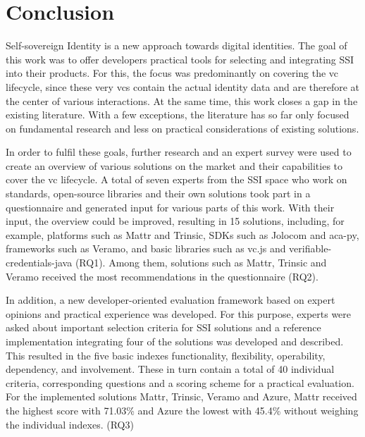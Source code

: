 \chapter{Conclusion}


Self-sovereign Identity is a new approach towards digital identities. The goal of this work was to offer developers practical tools for selecting and integrating \ac{SSI} into their products. For this, the focus was predominantly on covering the \ac{vc} lifecycle, since these very \acp{vc} contain the actual identity data and are therefore at the center of various interactions. At the same time, this work closes a gap in the existing literature. With a few exceptions, the literature has so far only focused on fundamental research and less on practical considerations of existing solutions.

In order to fulfil these goals, further research and an expert survey were used to create an overview of various solutions on the market and their capabilities to cover the \ac{vc} lifecycle. A total of seven experts from the \ac{SSI} space who work on standards, open-source libraries and their own solutions took part in a questionnaire and generated input for various parts of this work. With their input, the overview could be improved, resulting in 15 solutions, including, for example, platforms such as Mattr and Trinsic, SDKs such as Jolocom and aca-py, frameworks such as Veramo, and basic libraries such as vc.js and verifiable-credentials-java (RQ1). Among them, solutions such as Mattr, Trinsic and Veramo received the most recommendations in the questionnaire (RQ2).

In addition, a new developer-oriented evaluation framework based on expert opinions and practical experience was developed. For this purpose, experts were asked about important selection criteria for \ac{SSI} solutions and a reference implementation integrating four of the solutions was developed and described. This resulted in the five basic indexes functionality, flexibility, operability, dependency, and involvement. These in turn contain a total of 40 individual criteria, corresponding questions and a scoring scheme for a practical evaluation. For the implemented solutions Mattr, Trinsic, Veramo and Azure, Mattr received the highest score with 71.03\% and Azure the lowest with 45.4\% without weighing the individual indexes. (RQ3)

